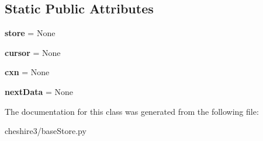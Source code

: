 \subsection*{Static Public Attributes}
\begin{DoxyCompactItemize}
\item 
\hypertarget{classcheshire3_1_1base_store_1_1_file_system_iter_ae9badbe90d7ee924fec60d43406a8ee3}{{\bfseries store} = None}\label{classcheshire3_1_1base_store_1_1_file_system_iter_ae9badbe90d7ee924fec60d43406a8ee3}

\item 
\hypertarget{classcheshire3_1_1base_store_1_1_file_system_iter_a50d89ed1fa5b2e61d7467bc1c938cb75}{{\bfseries cursor} = None}\label{classcheshire3_1_1base_store_1_1_file_system_iter_a50d89ed1fa5b2e61d7467bc1c938cb75}

\item 
\hypertarget{classcheshire3_1_1base_store_1_1_file_system_iter_a1b371b4d08f1ec3b7fd38cd565c6b2f3}{{\bfseries cxn} = None}\label{classcheshire3_1_1base_store_1_1_file_system_iter_a1b371b4d08f1ec3b7fd38cd565c6b2f3}

\item 
\hypertarget{classcheshire3_1_1base_store_1_1_file_system_iter_a367a3d14cb81d1e1c5b24f50a06bb6f0}{{\bfseries next\-Data} = None}\label{classcheshire3_1_1base_store_1_1_file_system_iter_a367a3d14cb81d1e1c5b24f50a06bb6f0}

\end{DoxyCompactItemize}


The documentation for this class was generated from the following file\-:\begin{DoxyCompactItemize}
\item 
cheshire3/base\-Store.\-py\end{DoxyCompactItemize}
